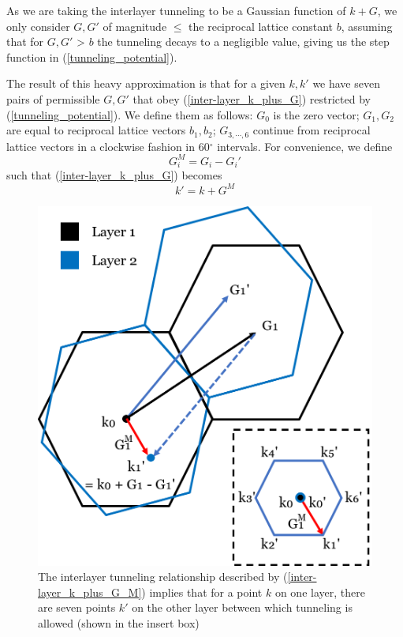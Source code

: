 \documentclass[12pt]{report} %
\begin{document}
As we are taking the interlayer tunneling to be a Gaussian function of $k+G$, we only consider $G, G'$ of magnitude $\leq$ the reciprocal lattice constant $b$, assuming that for $G, G'$ > $b$ the tunneling decays to a negligible value, giving us the step function in (\ref{tunneling_potential}).

The result of this heavy approximation is that for a given $k, k'$ we have seven pairs of permissible $G, G'$ that obey (\ref{inter-layer_k_plus_G}) restricted by (\ref{tunneling_potential}). We define them as follows: $G_0$ is the zero vector; $G_1, G_2$ are equal to reciprocal lattice vectors $b_1, b_2$; $G_{3,\cdots,6}$ continue from reciprocal lattice vectors in a clockwise fashion in 60$^\circ$ intervals. For convenience, we define
%
  \begin{equation}
    G_i^M = G_i - G_i'
    \label{inter-layer_G_M_def}
  \end{equation}
  such that (\ref{inter-layer_k_plus_G}) becomes
  \begin{equation}
    k' = k + G^M
    \label{inter-layer_k_plus_G_M}
  \end{equation}
%
\begin{figure}[t!]
\centering
\includegraphics[width=0.6\columnwidth]{k_prime_diagram.png}
  \caption{
    The interlayer tunneling relationship described by (\ref{inter-layer_k_plus_G_M}) implies that for a point $k$ on one layer, there are seven points $k'$ on the other layer between which tunneling is allowed (shown in the insert box)}
  \label{inter-layer_k_prime_diagram}
\end{figure}
\end{document}
